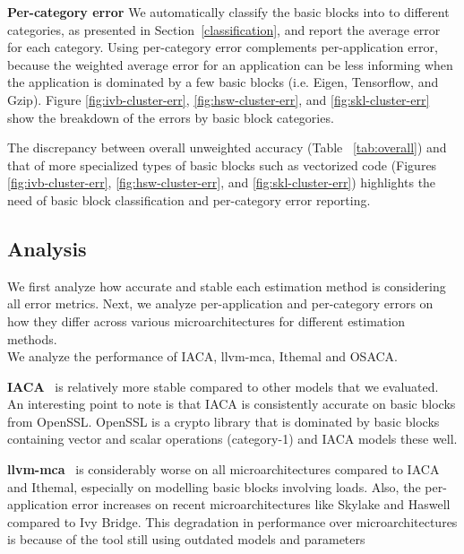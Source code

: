 \textbf{Per-category error} 
We automatically classify the basic blocks into
to different categories, as presented in Section~\ref{classification},
and report the average error for each category.
Using per-category error complements per-application error,
because the weighted average error for an application can be less informing 
when the application is dominated by a few basic blocks
(i.e. Eigen, Tensorflow, and Gzip).
Figure \ref{fig:ivb-cluster-err}, \ref{fig:hsw-cluster-err}, 
and \ref{fig:skl-cluster-err} show the breakdown of the errors by basic block categories.

The discrepancy between overall unweighted accuracy (Table ~\ref{tab:overall})
and that of more specialized types of basic blocks
such as vectorized code (Figures \ref{fig:ivb-cluster-err},
\ref{fig:hsw-cluster-err},
and \ref{fig:skl-cluster-err}) highlights
the need of basic block classification and per-category error reporting.

\subsection{Analysis}
 We first analyze how accurate and stable each estimation method is considering all error metrics. Next, we analyze per-application and per-category errors on how they differ across various microarchitectures for different estimation methods.\\
 
We analyze the performance of IACA, llvm-mca, Ithemal and OSACA.
 
 \textbf{IACA}~\cite{iaca} is relatively more stable compared to other models that we evaluated.
An interesting point to note is that IACA is consistently accurate on basic blocks from OpenSSL. 
OpenSSL is a crypto library that is dominated by basic blocks containing vector and scalar operations
(category-1) and IACA models these well. 

    \textbf{llvm-mca}~\cite{llvm-mca} is considerably worse on all microarchitectures compared to IACA and Ithemal,
especially on modelling basic blocks involving loads. Also, the per-application error increases on recent microarchitectures like Skylake and Haswell compared to Ivy Bridge.
This degradation in performance over microarchitectures is because of the tool still using outdated models and parameters

